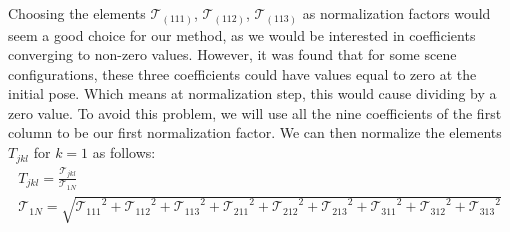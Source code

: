 Choosing the elements $\mathcal{T}_{(111)}$, $\mathcal{T}_{(112)}$, $\mathcal{T}_{(113)}$ as normalization factors would seem a good choice for our method, as we would be interested in coefficients converging to non-zero values. However, it was found that for some scene configurations, these three coefficients could have values equal to zero at the initial pose. Which means at normalization step, this would cause dividing by a zero value. To avoid this problem, we will use all the nine coefficients of the first column to be our first normalization factor. We can then normalize the elements $T_{jkl}$ for $k = 1$ as follows:
\begin{equation}
  \begin{gathered}
    T_{jkl} = \frac{\mathcal{T}_{jkl}}{\mathcal{T}_{1N}}\\
    \mathcal{T}_{1N} = \sqrt{{\mathcal{T}_{111}}^{2}+{\mathcal{T}_{112}}^{2}+{\mathcal{T}_{113}}^{2}+{\mathcal{T}_{211}}^{2}+{\mathcal{T}_{212}}^{2}+{\mathcal{T}_{213}}^{2}+{\mathcal{T}_{311}}^{2}+{\mathcal{T}_{312}}^{2}+{\mathcal{T}_{313}}^{2} }
  \end{gathered}
\end{equation}

